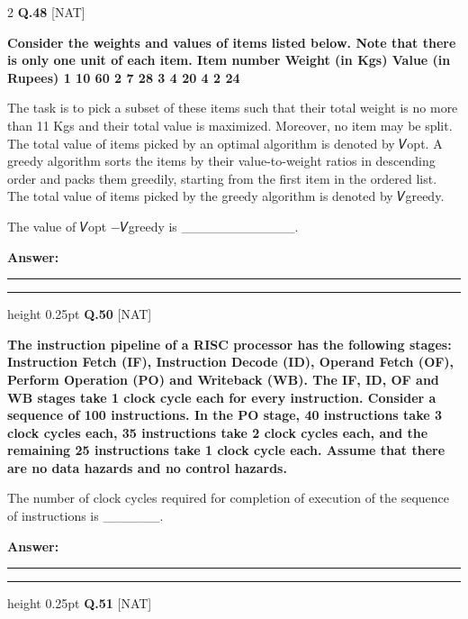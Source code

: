 \documentclass[a4paper,10pt,twoside]{article}
\begin{document}
\begin{multicols}{2}
\noindent\textbf{Q.48} \hfill {\footnotesize\textsf{[NAT]}}
\par\vspace{2pt}
{\bfseries Consider the weights and values of items listed below. Note that there is only one unit of
each item.
Item number
Weight
(in Kgs)
Value
(in Rupees)
1
10
60
2
7
28
3
4
20
4
2
24
\par\smallskip
The task is to pick a subset of these items such that their total weight is no more than 11 Kgs
and their total value is maximized. Moreover, no item may be split. The total value of items
picked by an optimal algorithm is denoted by 𝑉opt. A greedy algorithm sorts the items by
their value-to-weight ratios in descending order and packs them greedily, starting from the
first item in the ordered list. The total value of items picked by the greedy algorithm is
denoted by 𝑉greedy.
\par\smallskip
The value of 𝑉opt −𝑉greedy is \_\_\_\_\_\_\_\_\_\_\_\_. \par}
\par\vspace{3pt}\noindent\textbf{Answer:} \rule{3.2cm}{0.4pt}
\par\vspace{6pt}\hrule height 0.25pt\vspace{6pt}
\noindent\textbf{Q.50} \hfill {\footnotesize\textsf{[NAT]}}
\par\vspace{2pt}
{\bfseries The instruction pipeline of a RISC processor has the following stages: Instruction Fetch (IF),
Instruction Decode (ID), Operand Fetch (OF), Perform Operation (PO) and Writeback (WB).
The IF, ID, OF and WB stages take 1 clock cycle each for every instruction. Consider a
sequence of 100 instructions. In the PO stage, 40 instructions take 3 clock cycles each, 35
instructions take 2 clock cycles each, and the remaining 25 instructions take 1 clock cycle
each. Assume that there are no data hazards and no control hazards.
\par\smallskip
The number of clock cycles required for completion of execution of the sequence of
instructions is \_\_\_\_\_\_. \par}
\par\vspace{3pt}\noindent\textbf{Answer:} \rule{3.2cm}{0.4pt}
\par\vspace{6pt}\hrule height 0.25pt\vspace{6pt}
\noindent\textbf{Q.51} \hfill {\footnotesize\textsf{[NAT]}}

\end{multicols}
\end{document}
